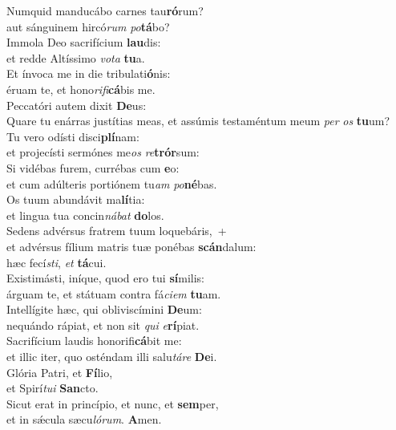 \evenverse Numquid manducábo carnes tau\textbf{ró}rum?~\*\\
\evenverse aut sánguinem hircó\textit{rum} \textit{po}\textbf{tá}bo?\\
\oddverse Immola Deo sacrifícium \textbf{lau}dis:~\*\\
\oddverse et redde Altíssimo \textit{vo}\textit{ta} \textbf{tu}a.\\
\evenverse Et ínvoca me in die tribulati\textbf{ó}nis:~\*\\
\evenverse éruam te, et hono\textit{ri}\textit{fi}\textbf{cá}bis me.\\
\oddverse Peccatóri autem dixit \textbf{De}us:~\*\\
\oddverse Quare tu enárras justítias meas, et assúmis testaméntum meum \textit{per} \textit{os} \textbf{tu}um?\\
\evenverse Tu vero odísti disci\textbf{plí}nam:~\*\\
\evenverse et projecísti sermónes me\textit{os} \textit{re}\textbf{trór}sum:\\
\oddverse Si vidébas furem, currébas cum \textbf{e}o:~\*\\
\oddverse et cum adúlteris portiónem tu\textit{am} \textit{po}\textbf{né}bas.\\
\evenverse Os tuum abundávit ma\textbf{lí}tia:~\*\\
\evenverse et lingua tua concin\textit{ná}\textit{bat} \textbf{do}los.\\
\oddverse Sedens advérsus fratrem tuum loquebáris,~+\\
\oddverse  et advérsus fílium matris tuæ ponébas \textbf{scán}dalum:~\*\\
\oddverse hæc fecí\textit{sti}, \textit{et} \textbf{tá}cui.\\
\evenverse Existimásti, iníque, quod ero tui \textbf{sí}milis:~\*\\
\evenverse árguam te, et státuam contra fá\textit{ci}\textit{em} \textbf{tu}am.\\
\oddverse Intellígite hæc, qui obliviscímini \textbf{De}um:~\*\\
\oddverse nequándo rápiat, et non sit \textit{qui} \textit{e}\textbf{rí}piat.\\
\evenverse Sacrifícium laudis honorifi\textbf{cá}bit me:~\*\\
\evenverse et illic iter, quo osténdam illi salu\textit{tá}\textit{re} \textbf{De}i.\\
\oddverse Glória Patri, et \textbf{Fí}lio,~\*\\
\oddverse et Spirí\textit{tu}\textit{i} \textbf{San}cto.\\
\evenverse Sicut erat in princípio, et nunc, et \textbf{sem}per,~\*\\
\evenverse et in sǽcula sæcu\textit{ló}\textit{rum}. \textbf{A}men.\\
